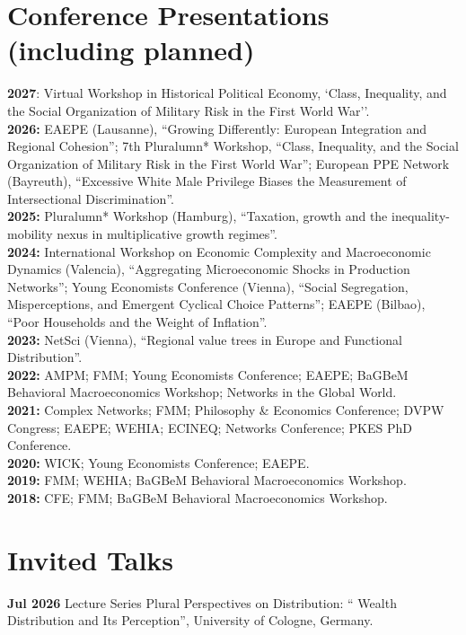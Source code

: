 \documentclass[margin]{res}
\begin{document}
\begin{resume}
	\section{Conference Presentations (including planned)}
	\textbf{2027}: Virtual Workshop in Historical Political Economy, `Class, Inequality, and the Social Organization of Military Risk in the First World War''.\\
	\textbf{2026:} EAEPE (Lausanne), ``Growing Differently: European Integration and Regional Cohesion''; 7th Pluralumn* Workshop, ``Class, Inequality, and the Social Organization of Military Risk in the First World War''; European PPE Network (Bayreuth), ``Excessive White Male Privilege Biases the Measurement of Intersectional Discrimination''.\\
	\textbf{2025:} Pluralumn* Workshop (Hamburg), ``Taxation, growth and the inequality-mobility nexus in multiplicative growth regimes''.\\
	\textbf{2024:} International Workshop on Economic Complexity and Macroeconomic Dynamics (Valencia), ``Aggregating Microeconomic Shocks in Production Networks''; Young Economists Conference (Vienna), ``Social Segregation, Misperceptions, and Emergent Cyclical Choice Patterns''; EAEPE (Bilbao), ``Poor Households and the Weight of Inflation''.\\
	\textbf{2023:} NetSci (Vienna), ``Regional value trees in Europe and Functional Distribution''.\\
	\textbf{2022:} AMPM; FMM; Young Economists Conference; EAEPE; BaGBeM Behavioral Macroeconomics Workshop; Networks in the Global World.\\
	\textbf{2021:} Complex Networks; FMM; Philosophy \& Economics Conference; DVPW Congress; EAEPE; WEHIA; ECINEQ; Networks Conference; PKES PhD Conference.\\
	\textbf{2020:} WICK; Young Economists Conference; EAEPE.\\
	\textbf{2019:} FMM; WEHIA; BaGBeM Behavioral Macroeconomics Workshop.\\
	\textbf{2018:} CFE; FMM; BaGBeM Behavioral Macroeconomics Workshop.\\
	
	\section{Invited Talks} 
	\textbf{Jul 2026} Lecture Series Plural Perspectives on Distribution: `` Wealth Distribution and Its Perception'', University of Cologne, Germany.
	

\end{resume}
\end{document}
